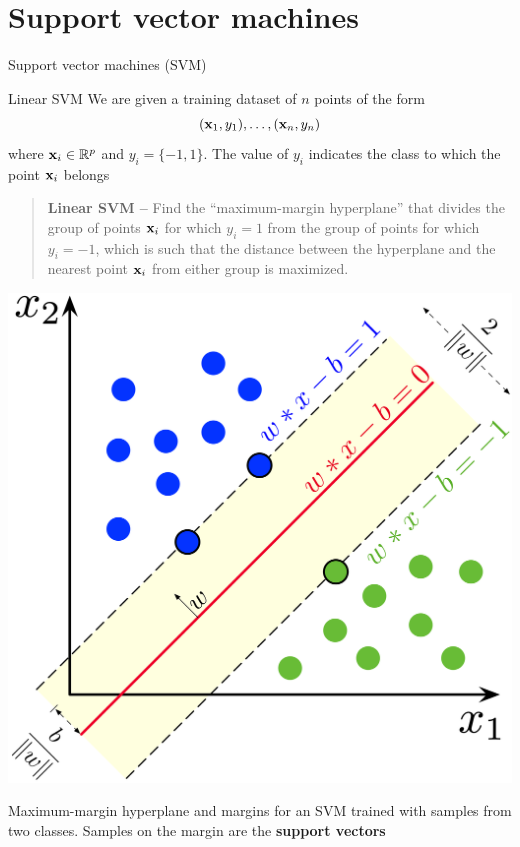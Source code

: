\documentclass[aspectratio=169]{beamer}
\begin{document}
\section{Support vector machines}

\begin{frame}{Support vector machines (SVM)}

\end{frame}

\begin{frame}{Linear SVM}
    We are given a training dataset of $n$ points of the form
    \[ 
        (\mathbf{x}_1, y_1), \ldots, (\mathbf{x}_n, y_n)
    \]
    where $\mathbf{x}_i\in\mathbb{R}^p$ and $y_i=\{-1,1\}$. The value of $y_i$ indicates the class to which the point $\mathbf{x}_i $ belongs
    \vfill
    \begin{quote}\textbf{Linear SVM --}
        Find the ``maximum-margin hyperplane'' that divides the group of points $\mathbf{x}_i$ for which $y_i = 1$ from the group of points for which $y_i = -1$, which is such that the distance between the hyperplane and the nearest point $\mathbf{x}_i$ from either group is maximized.
    \end{quote}
\end{frame}

\begin{frame}
    \begin{minipage}{0.7\textwidth}
        \includegraphics[height=\textheight]{FIGS_slides/SVM_margin}
    \end{minipage}
    \begin{minipage}{0.28\textwidth}
        Maximum-margin hyperplane and margins for an SVM trained with samples from two classes. Samples on the margin are the \textbf{support vectors}
    \end{minipage}
\end{frame}
\end{document}
